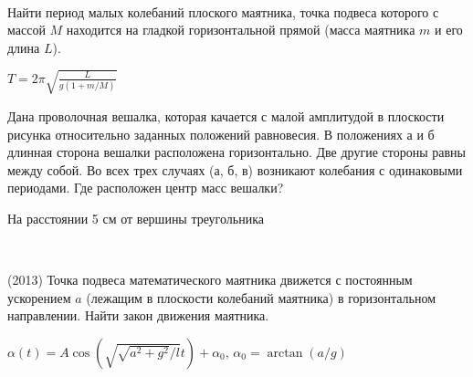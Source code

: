 \begin{ex}
\hspace{0pt} \\
\begin{minipage}{.65\textwidth} 
Найти период малых колебаний плоского маятника, точка подвеса которого с массой $M$ находится на гладкой горизонтальной прямой 
(масса маятника $m$ и его длина $L$).
\end{minipage}
\begin{minipage}{.35\textwidth}
\centering

\end{minipage}
\begin{ans}
$T=2\pi \sqrt{\frac{L}{g(1+m/M)}}$
\end{ans}
\end{ex}

\begin{ex}
Дана проволочная вешалка, которая качается с малой амплитудой в плоскости рисунка относительно заданных положений равновесия. 
В положениях а и б длинная сторона вешалки расположена горизонтально. Две другие стороны равны между собой. 
Во всех трех случаях (а, б, в) возникают колебания с одинаковыми периодами. Где расположен центр масс вешалки?
\begin{center}

\end{center}
\begin{ans}
На расстоянии 5 см от вершины треугольника
\end{ans}
\end{ex}

\begin{ex}
\hspace{0pt} \\
\begin{minipage}{.65\textwidth}
(2013) Точка подвеса математического маятника движется с постоянным ускорением $a$ (лежащим в плоскости колебаний маятника) в горизонтальном направлении. Найти закон движения маятника.
\end{minipage}
\begin{minipage}{.35\textwidth}
\centering

\end{minipage}
\begin{ans}
$\alpha(t) = A \cos(\sqrt{\sqrt{a^2+g^2}/l}t) + \alpha_0$, $\alpha_0 = \arctan(a/g)$
\end{ans}
\end{ex}

